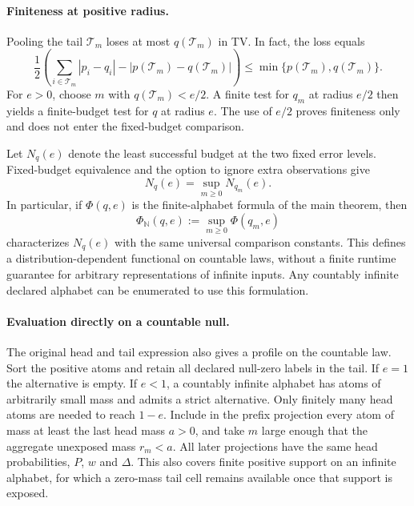 \paragraph{Finiteness at positive radius.}
Pooling the tail \(\mathcal T_m\) loses at most \(q(\mathcal T_m)\) in
TV. In fact, the loss equals
\[
 \frac12\left(\sum_{i\in\mathcal T_m}|p_i-q_i|
                  -|p(\mathcal T_m)-q(\mathcal T_m)|\right)
 \leq \min\{p(\mathcal T_m),q(\mathcal T_m)\}.
\]
For \(e>0\), choose \(m\) with \(q(\mathcal T_m)<e/2\). A finite test for
\(q_m\) at radius \(e/2\) then yields a finite-budget test for \(q\) at
radius \(e\). The use of \(e/2\) proves finiteness only and does not enter
the fixed-budget comparison.

Let \(N_q(e)\) denote the least successful budget at the two fixed error
levels. Fixed-budget equivalence and the option to ignore extra
observations give
\[
 N_q(e)=\sup_{m\geq0}N_{q_m}(e).
\]
In particular, if \(\Phi(q,e)\) is the finite-alphabet formula of the
main theorem, then
\[
 \Phi_{\mathbb N}(q,e):=\sup_{m\geq0}\Phi(q_m,e)
\]
characterizes \(N_q(e)\) with the same universal comparison constants.
This defines a distribution-dependent functional on countable laws,
without a finite runtime guarantee for arbitrary representations of
infinite inputs. Any countably infinite declared alphabet can be
enumerated to use this formulation.

\paragraph{Evaluation directly on a countable null.}
The original head and tail expression also gives a profile on the countable law.
Sort the positive atoms and retain all declared null-zero labels in the tail.
If $e=1$ the alternative is empty. If $e<1$, a countably infinite alphabet
has atoms of arbitrarily small mass and admits a strict alternative.
Only finitely many head atoms are needed to reach $1-e$. Include in the
prefix projection every atom of mass at least the last head mass $a>0$,
and take $m$ large enough that the aggregate unexposed mass $r_m<a$.
All later projections have the same head probabilities, $P$, $w$ and
$\Delta$. This also covers finite positive support on an infinite alphabet,
for which a zero-mass tail cell remains available once that support is exposed.

